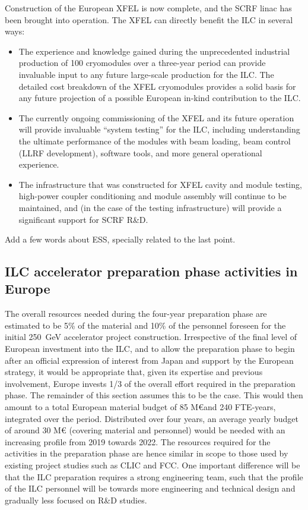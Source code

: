 \documentclass[%
 reprint,
 amsmath,amssymb,
 aps,
]{revtex4-1}
\begin{document}
Construction of the European XFEL is now complete, and the SCRF linac has been brought into operation. The XFEL can directly benefit the ILC in several ways: \\
\begin{itemize}
\item The experience and knowledge gained during the unprecedented industrial
production of 100 cryomodules over a three-year period can provide 
invaluable input to any future large-scale production for the ILC. The detailed cost breakdown of the XFEL cryomodules provides a solid basis for any future projection of a possible European in-kind contribution to the ILC. 
\item 
The currently ongoing commissioning of the XFEL and its future operation will provide invaluable ``system testing'' for the ILC, including understanding the ultimate performance of the modules with beam loading, beam control (LLRF development), software tools, and more general operational experience. 
\item The infrastructure that was constructed for XFEL cavity and module 
testing, high-power coupler conditioning and module assembly will continue to be maintained, and (in the case of the testing infrastructure) will provide a significant support for SCRF R\&D.
\end{itemize}

Add a few words about ESS, specially related to the last point.

\subsection{ILC accelerator preparation phase activities in Europe ~\label{sec:prepphase:accelerator}}

The overall resources needed during the four-year preparation phase are estimated to be 5\% of the material and 10\% of the personnel foreseen for the initial 250~GeV accelerator project construction. Irrespective of the final level of European investment into the ILC, and to allow the preparation phase to begin after an official expression of interest from Japan and support by the European strategy, it would be appropriate that, given its expertise and previous involvement, Europe invests 1/3 of the overall effort required in the preparation phase. The remainder of this section assumes this to be the case. This would then amount to a total European material budget of 85 M\euro and 240 FTE-years, integrated over the period.
Distributed over four years, an average yearly budget of around 30 M\euro{} (covering material and personnel) would be needed with an increasing profile from 2019 towards 2022. The resources required for the activities in the preparation phase are hence similar in scope to those used by existing project studies such as CLIC and FCC. One important difference will be that the ILC preparation requires a strong engineering team, such that the profile of the ILC personnel will be towards more engineering and technical design and gradually less focused on R\&D studies.
\end{document}
